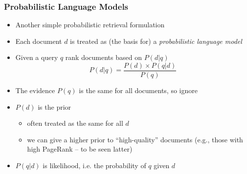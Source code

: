 \documentclass[svgnames]{beamer}
\begin{document}
\begin{frame} \frametitle{Probabilistic Language Models}
  \begin{block}{}
    \begin{itemize}
\item Another simple probabilistic retrieval formulation
\item Each document $d$ is treated as (the basis for) a \emph{probabilistic language model}
\item Given a query $q$ rank documents based on $P(d|q)$
\begin{equation*}
P(d|q) = \frac{P(d) \times P(q|d)}{P(q)}
\end{equation*}
\item The evidence $P(q)$ is the same for all documents, so ignore
\item $P(d)$ is the prior
\begin{itemize}
\item often treated as the same for all $d$
\item  we can give a higher prior to ``high-quality'' documents (e.g., those with high PageRank -- to be seen latter)
\end{itemize}
\item $P(q|d)$ is likelihood, i.e. the probability of $q$ given $d$
    \end{itemize}
  \end{block}

\end{frame}
\end{document}
